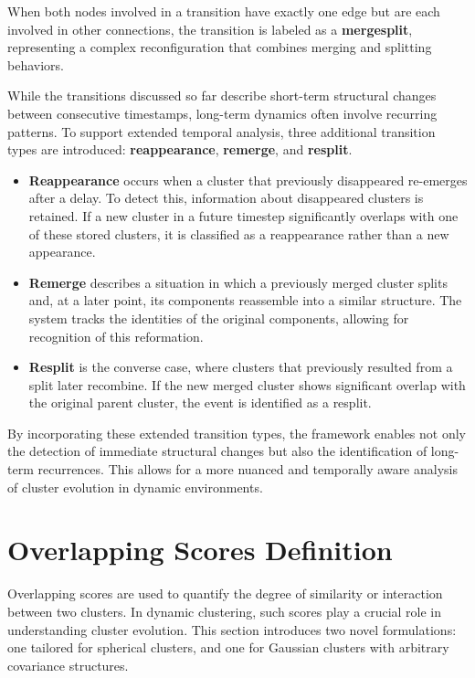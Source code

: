 When both nodes involved in a transition have exactly one edge but are each
involved in other connections, the transition is labeled as a
\textbf{mergesplit}, representing a complex reconfiguration that combines
merging and splitting behaviors.



While the transitions discussed so far describe short-term structural changes
between consecutive timestamps, long-term dynamics often involve recurring
patterns. To support extended temporal analysis, three additional transition
types are introduced: \textbf{reappearance}, \textbf{remerge}, and
\textbf{resplit}.

\begin{itemize}
      \item \textbf{Reappearance} occurs when a cluster that previously
            disappeared re-emerges after a delay. To detect this, information
            about disappeared clusters is retained. If a new cluster in a future
            timestep significantly overlaps with one of these stored clusters, it
            is classified as a reappearance rather than a new appearance.

      \item \textbf{Remerge} describes a situation in which a previously
            merged cluster splits and, at a later point, its components reassemble
            into a similar structure. The system tracks the identities of the
            original components, allowing for recognition of this reformation.

      \item \textbf{Resplit} is the converse case, where clusters that
            previously resulted from a split later recombine. If the new merged
            cluster shows significant overlap with the original parent cluster,
            the event is identified as a resplit.
\end{itemize}

By incorporating these extended transition types, the framework enables not
only the detection of immediate structural changes but also the identification
of long-term recurrences. This allows for a more nuanced and temporally aware
analysis of cluster evolution in dynamic environments.

\section{Overlapping Scores Definition}\label{sec:overlapping_scores}
Overlapping scores are used to quantify the degree of similarity or interaction
between two clusters. In dynamic clustering, such scores play a crucial role in
understanding cluster evolution. This section introduces two novel
formulations: one tailored for spherical clusters, and one for Gaussian
clusters with arbitrary covariance structures.

